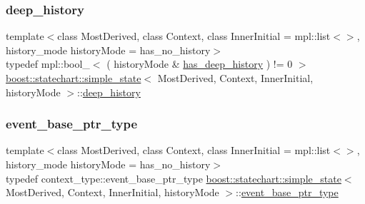 \subsubsection{\texorpdfstring{deep\+\_\+history}{deep\_history}}
{\footnotesize\ttfamily template$<$class Most\+Derived, class Context, class Inner\+Initial = mpl\+::list$<$$>$, history\+\_\+mode history\+Mode = has\+\_\+no\+\_\+history$>$ \\
typedef mpl\+::bool\+\_\+$<$ ( history\+Mode \& \mbox{\hyperlink{namespaceboost_1_1statechart_a9c4ec64d7a0422b8b9c97b489f731372aac03603fa90405ad5de45cc858477c7d}{has\+\_\+deep\+\_\+history}} ) != 0 $>$ \mbox{\hyperlink{classboost_1_1statechart_1_1simple__state}{boost\+::statechart\+::simple\+\_\+state}}$<$ Most\+Derived, Context, Inner\+Initial, history\+Mode $>$\+::\mbox{\hyperlink{classboost_1_1statechart_1_1simple__state_a2e6aa9f4912c70a9dbef800845044bc7}{deep\+\_\+history}}}

\mbox{\label{classboost_1_1statechart_1_1simple__state_aeea28c41a57acb4507e30ca5adb6016f}} 
\subsubsection{\texorpdfstring{event\+\_\+base\+\_\+ptr\+\_\+type}{event\_base\_ptr\_type}}
{\footnotesize\ttfamily template$<$class Most\+Derived, class Context, class Inner\+Initial = mpl\+::list$<$$>$, history\+\_\+mode history\+Mode = has\+\_\+no\+\_\+history$>$ \\
typedef context\+\_\+type\+::event\+\_\+base\+\_\+ptr\+\_\+type \mbox{\hyperlink{classboost_1_1statechart_1_1simple__state}{boost\+::statechart\+::simple\+\_\+state}}$<$ Most\+Derived, Context, Inner\+Initial, history\+Mode $>$\+::\mbox{\hyperlink{classboost_1_1statechart_1_1simple__state_aeea28c41a57acb4507e30ca5adb6016f}{event\+\_\+base\+\_\+ptr\+\_\+type}}}

\mbox{\label{classboost_1_1statechart_1_1simple__state_a153e115715f5d828021a273ce282ba9b}} 
